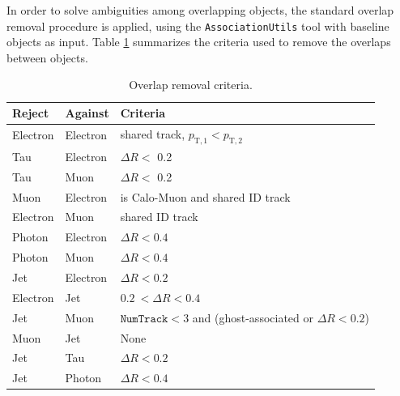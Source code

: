 In order to solve ambiguities among overlapping objects, the standard overlap removal procedure is applied, using the \texttt{AssociationUtils} tool with baseline objects as input. 
Table \ref{tab:or} summarizes the criteria used to remove the overlaps between objects.

\begin{table}[ht]
  \caption{Overlap removal criteria.}%
  \label{tab:or}
  \centering 
  \begin{tabular}{lll}
    \toprule
    Reject & Against & Criteria \\
    \midrule
    Electron	& Electron & shared track, \(p_{\text{T},1} < p_{\text{T},2}\) \\
    Tau      	 	& Electron & \(\Delta R <\) 0.2 \\
    Tau       	 	& Muon     & \(\Delta R <\) 0.2 \\
    Muon     	& Electron & is Calo-Muon and shared ID track \\
    Electron 	& Muon     & shared ID track \\
    Photon   	& Electron & \(\Delta R < 0.4\) \\
    Photon   	& Muon     & \(\Delta R < 0.4\) \\
    Jet      		& Electron & \(\Delta R < 0.2\) \\
    Electron 	& Jet      & \(0.2\ < \Delta R < 0.4\) \\
    Jet      		& Muon     & \(\texttt{NumTrack} < 3\) and (ghost-associated or \(\Delta R < 0.2\)) \\
                       	
    Muon     	& Jet      & None \\
    Jet      		& Tau      & \(\Delta R < 0.2\) \\
    Jet   	& Photon      & \(\Delta R < 0.4\) \\
    \bottomrule
  \end{tabular}
\end{table}
